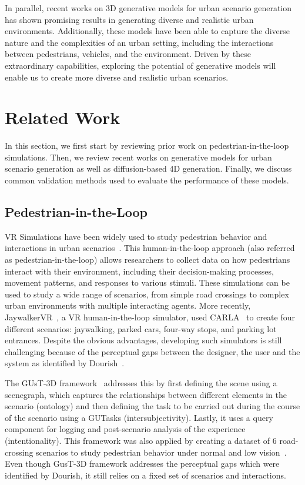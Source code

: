 \documentclass{article}
\begin{document}
In parallel, recent works on 3D generative models for urban scenario generation has shown promising results in generating diverse and realistic urban environments. Additionally, these models have been able to capture the diverse nature and the complexities of an urban setting, including the interactions between pedestrians, vehicles, and the environment. Driven by these extraordinary capabilities, exploring the potential of generative models will enable us to create more diverse and realistic urban scenarios.

\section{Related Work}

In this section, we first start by reviewing prior work on pedestrian-in-the-loop simulations. Then, we review recent works on generative models for urban scenario generation as well as diffusion-based 4D generation. Finally, we discuss common validation methods used to evaluate the performance of these models.

\subsection{Pedestrian-in-the-Loop}

VR Simulations have been widely used to study pedestrian behavior and interactions in urban scenarios~\cite{wu2018using,tran2021review,mukoya2024jaywalkervr,schneider2020virtually}. This human-in-the-loop approach (also referred as pedestrian-in-the-loop\cite{hartmann2017pedestrian}) allows researchers to collect data on how pedestrians interact with their environment, including their decision-making processes, movement patterns, and responses to various stimuli. These simulations can be used to study a wide range of scenarios, from simple road crossings to complex urban environments with multiple interacting agents. More recently, JaywalkerVR~\cite{mukoya2024jaywalkervr}, a VR human-in-the-loop simulator, used CARLA~\cite{dosovitskiy2017carla} to create four different scenarios: jaywalking, parked cars, four-way stops, and parking lot entrances. Despite the obvious advantages, developing such simulators is still challenging because of the perceptual gaps between the designer, the user and the system as identified by Dourish~\cite{dourish2001action}.

The GUsT-3D framework~\cite{wu2022designing} addresses this by first defining the scene using a scenegraph, which captures the relationships between different elements in the scenario (ontology) and then defining the task to be carried out during the course of the scenario using a GUTasks (intersubjectivity). Lastly, it uses a query component for logging and post-scenario analysis of the experience (intentionality). This framework was also applied by creating a dataset of 6 road-crossing scenarios to study pedestrian behavior under normal and low vision~\cite{wu2023exploring}. Even though GusT-3D framework addresses the perceptual gaps which were identified by Dourish, it still relies on a fixed set of scenarios and interactions.
\end{document}
